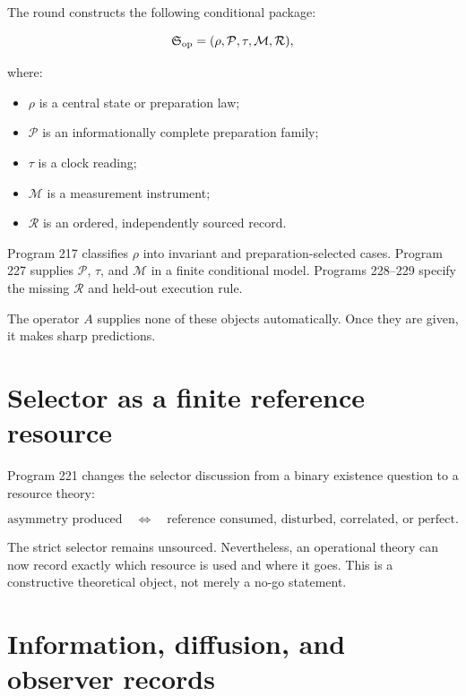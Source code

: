\documentclass[11pt,a4paper,openany]{report}
\begin{document}
The round constructs the following conditional package:

\[
\mathfrak S_{\rm op}
=
(\rho,\mathcal P,\tau,\mathcal M,\mathcal R),
\]

where:

\begin{itemize}
\item 
\(\rho\) is a central state or preparation law;

\item 
\(\mathcal P\) is an informationally complete preparation family;

\item 
\(\tau\) is a clock reading;

\item 
\(\mathcal M\) is a measurement instrument;

\item 
\(\mathcal R\) is an ordered, independently sourced record.

\end{itemize}

Program 217 classifies \(\rho\) into invariant and preparation-selected cases. Program 227 supplies \(\mathcal P\), \(\tau\), and \(\mathcal M\) in a finite conditional model. Programs 228--229 specify the missing \(\mathcal R\) and held-out execution rule.

The operator \(A\) supplies none of these objects automatically. Once they are given, it makes sharp predictions.

\section{Selector as a finite reference resource}

Program 221 changes the selector discussion from a binary existence question to a resource theory:

\[
\text{asymmetry produced}
\quad\Longleftrightarrow\quad
\text{reference consumed, disturbed, correlated, or perfect}.
\]

The strict selector remains unsourced. Nevertheless, an operational theory can now record exactly which resource is used and where it goes. This is a constructive theoretical object, not merely a no-go statement.

\section{Information, diffusion, and observer records}
\end{document}
